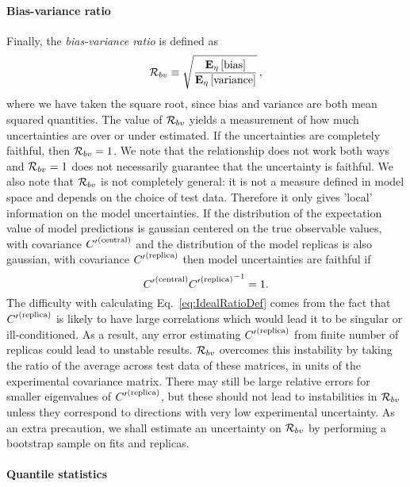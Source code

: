 \paragraph{Bias-variance ratio}

Finally, the {\em bias-variance ratio} is defined as
\begin{equation}
    \label{eq:RatioDef}
    \mathcal{R}_{bv} \equiv \sqrt{\frac{\mathbf{E}_{\eta}\left[ {\rm bias} \right]}{\mathbf{E}_{\eta}\left[ {\rm variance} \right]}}\, ,
\end{equation}
where we have taken the square root, since bias and variance are both mean
squared quantities. The value of $\mathcal{R}_{bv}$ yields a measurement of how
much uncertainties are over or under estimated. If the uncertainties are
completely faithful, then $\mathcal{R}_{bv} = 1$. We note that the relationship
does not work both ways and $\mathcal{R}_{bv} = 1$ does not necessarily guarantee
that the uncertainty is faithful. We also note that $\mathcal{R}_{bv}$ is not
completely general: it is not a measure defined in model space and depends on
the choice of test data. Therefore it only gives 'local' information on the
model uncertainties. If the distribution of the expectation value of model
predictions is gaussian centered on the true observable values, with covariance
${{C}^{\prime}}^{(\rm central)}$ and the distribution of the model replicas is also gaussian, with
covariance ${{C}^{\prime}}^{(\rm replica)}$ then model uncertainties are faithful if
\begin{equation}\label{eq:IdealRatioDef}
    {{C}^{\prime}}^{(\rm central)} {{{C}^{\prime}}^{(\rm replica)}}^{-1} = 1.
\end{equation}
The difficulty with calculating Eq.~\ref{eq:IdealRatioDef} comes from the fact
that ${{C}^{\prime}}^{(\rm replica)}$ is likely to have large correlations which would lead it to be
singular or ill-conditioned. As a result, any error estimating ${{C}^{\prime}}^{(\rm replica)}$ from
finite number of replicas could lead to unstable results. $\mathcal{R}_{bv}$
overcomes this instability by taking the ratio of the average across test data
of these matrices, in units of the experimental covariance matrix. There may
still be large relative errors for smaller eigenvalues of ${{C}^{\prime}}^{(\rm replica)}$, but these
should not lead to instabilities in $\mathcal{R}_{bv}$ unless they correspond to
directions with very low experimental uncertainty. As an extra precaution, we
shall estimate an uncertainty on $\mathcal{R}_{bv}$ by performing a bootstrap
sample on fits and replicas.

\paragraph{Quantile statistics}

